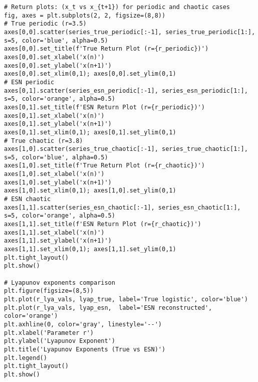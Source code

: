 \begin{verbatim}
# Return plots: (x_t vs x_{t+1}) for periodic and chaotic cases
fig, axes = plt.subplots(2, 2, figsize=(8,8))
# True periodic (r=3.5)
axes[0,0].scatter(series_true_periodic[:-1], series_true_periodic[1:], s=5, color='blue', alpha=0.5)
axes[0,0].set_title(f'True Return Plot (r={r_periodic})')
axes[0,0].set_xlabel('x(n)')
axes[0,0].set_ylabel('x(n+1)')
axes[0,0].set_xlim(0,1); axes[0,0].set_ylim(0,1)
# ESN periodic
axes[0,1].scatter(series_esn_periodic[:-1], series_esn_periodic[1:], s=5, color='orange', alpha=0.5)
axes[0,1].set_title(f'ESN Return Plot (r={r_periodic})')
axes[0,1].set_xlabel('x(n)')
axes[0,1].set_ylabel('x(n+1)')
axes[0,1].set_xlim(0,1); axes[0,1].set_ylim(0,1)
# True chaotic (r=3.8)
axes[1,0].scatter(series_true_chaotic[:-1], series_true_chaotic[1:], s=5, color='blue', alpha=0.5)
axes[1,0].set_title(f'True Return Plot (r={r_chaotic})')
axes[1,0].set_xlabel('x(n)')
axes[1,0].set_ylabel('x(n+1)')
axes[1,0].set_xlim(0,1); axes[1,0].set_ylim(0,1)
# ESN chaotic
axes[1,1].scatter(series_esn_chaotic[:-1], series_esn_chaotic[1:], s=5, color='orange', alpha=0.5)
axes[1,1].set_title(f'ESN Return Plot (r={r_chaotic})')
axes[1,1].set_xlabel('x(n)')
axes[1,1].set_ylabel('x(n+1)')
axes[1,1].set_xlim(0,1); axes[1,1].set_ylim(0,1)
plt.tight_layout()
plt.show()

# Lyapunov exponents comparison
plt.figure(figsize=(8,5))
plt.plot(r_lya_vals, lyap_true, label='True logistic', color='blue')
plt.plot(r_lya_vals, lyap_esn,  label='ESN reconstructed', color='orange')
plt.axhline(0, color='gray', linestyle='--')
plt.xlabel('Parameter r')
plt.ylabel('Lyapunov Exponent')
plt.title('Lyapunov Exponents (True vs ESN)')
plt.legend()
plt.tight_layout()
plt.show()
\end{verbatim}